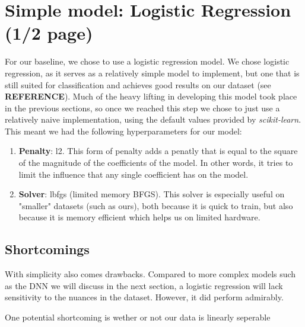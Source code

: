 \section{Simple model: Logistic Regression (1/2 page)} 
For our baseline, we chose to use a logistic regression model. We chose logistic regression, as it serves as a
relatively simple model to implement, but one that is still suited for classification and achieves good results on our
dataset (see \textbf{REFERENCE}). Much of the heavy lifting in developing this model took place in the previous sections,
so once we reached this step we chose to just use a relatively naive implementation, using the default values provided
by \textit{scikit-learn}. This meant we had the following hyperparameters for our model:

\begin{enumerate}
  \item \textbf{Penalty}: l2. This form of penalty adds a penatly that is equal to the square of the magnitude of the
    coefficients of the model. In other words, it tries to limit the influence that any single coefficient has on the
    model.

  \item \textbf{Solver}: lbfgs (limited memory BFGS). This solver is especially useful on "smaller" datasets (such as
    ours), both because it is quick to train, but also because it is memory efficient which helps us on limited
    hardware.

\end{enumerate}

\subsection{Shortcomings}
With simplicity also comes drawbacks. Compared to more complex models such as the DNN we will discuss in the next
section, a logistic regression will lack sensitivity to the nuances in the dataset. However, it did perform admirably.

One potential shortcoming is wether or not our data is linearly seperable


